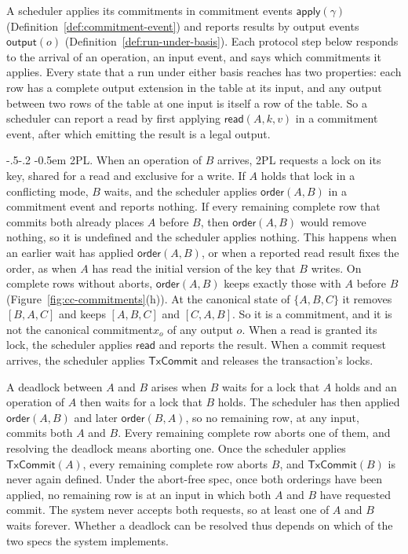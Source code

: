 \documentclass[sigconf]{cidr-2027}
\makeatletter
\theoremstyle{remark}
\renewcommand\paragraph{\@startsection{paragraph}{4}{\z@}%
  {-.5\baselineskip \@plus -2\p@ \@minus -.2\p@}%
  {-0.5em}%
  {\normalfont\bfseries}}
\newcommand{\commitment}{commitment\xspace}
\newcommand{\commitments}{commitments\xspace}
\newcommand{\outnoun}{output extension\xspace}%
\makeatother
\begin{document}
A scheduler applies its \commitments in \commitment events
$\mathsf{apply}(\gamma)$ (Definition~\ref{def:commitment-event}) and reports
results by output events $\mathsf{output}(o)$
(Definition~\ref{def:run-under-basis}). Each protocol step below responds to
the arrival of an operation, an input event, and says which \commitments it
applies. Every state that a run under either basis reaches has two
properties: each row has a complete \outnoun in the table at its input, and
any output between two rows of the table at one input is itself a row of the
table. So a scheduler can report a read by first applying
$\mathsf{read}(A,k,v)$ in a \commitment event, after which emitting the result
is a legal output.

\paragraph{2PL.}
When an operation of $B$ arrives, 2PL requests a lock on its key, shared for a
read and exclusive for a write. If $A$ holds that lock in a conflicting mode,
$B$ waits, and the scheduler applies $\mathsf{order}(A,B)$ in a \commitment
event and reports nothing. If every remaining complete row that commits both
already places $A$ before $B$, then $\mathsf{order}(A,B)$ would remove
nothing, so it is undefined and the scheduler applies nothing. This happens
when an earlier wait has applied $\mathsf{order}(A,B)$, or when a reported
read result fixes the order, as when $A$ has read the initial version of the
key that $B$ writes. On complete rows without aborts, $\mathsf{order}(A,B)$
keeps exactly those with $A$ before $B$ (Figure~\ref{fig:cc-commitments}(h)). At the canonical state of $\{A,B,C\}$ it removes $[B,A,C]$ and keeps
$[A,B,C]$ and $[C,A,B]$. So it is a \commitment, and it is not the canonical
\commitment $x_o$ of any output $o$. When a read is granted its lock, the
scheduler applies $\mathsf{read}$ and reports the result. When a commit
request arrives, the scheduler applies $\mathsf{TxCommit}$ and releases the
transaction's locks.

A deadlock between $A$ and $B$ arises when $B$ waits for a lock that $A$ holds
and an operation of $A$ then waits for a lock that $B$ holds. The scheduler
has then applied $\mathsf{order}(A,B)$ and later $\mathsf{order}(B,A)$, so no
remaining row, at any input, commits both $A$ and $B$. Every remaining
complete row aborts one of them, and resolving the deadlock means aborting
one. Once the scheduler applies $\mathsf{TxCommit}(A)$, every remaining
complete row aborts $B$, and $\mathsf{TxCommit}(B)$ is never again defined. Under the abort-free spec, once both orderings have been applied, no remaining
row is at an input in which both $A$ and $B$ have requested commit. The
system never accepts both requests, so at least one of $A$ and $B$ waits
forever. Whether a deadlock can be resolved thus depends on which of the two
specs the system implements.
\end{document}

